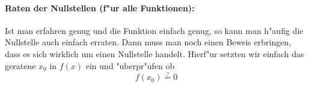 \paragraph{Raten der Nullstellen (f"ur alle Funktionen):}
Ist man erfahren genug und die Funktion einfach genug, so kann man h"aufig die Nullstelle auch einfach erraten. Dann muss man noch einen Beweis erbringen, dass es sich wirklich um einen Nullstelle handelt. Hierf"ur setzten wir einfach das geratene $x_0$ in $f(x)$ ein und "uberpr"ufen ob 
\begin{equation*}
f(x_0) \stackrel{?}{=} 0
\end{equation*}

